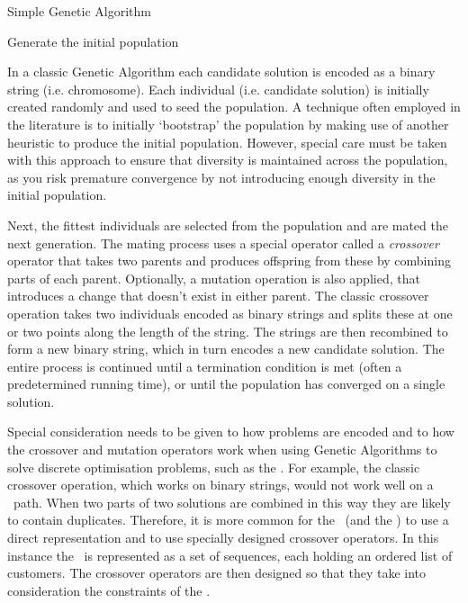 \begin{algorithm}[H]
   \caption{Simple Genetic Algorithm}
   Generate the initial population\\
\end{algorithm}

In a classic Genetic Algorithm each candidate solution is encoded as a binary string (i.e. chromosome). Each individual (i.e. candidate solution) is initially created randomly and used to seed the population. A technique often employed in the literature is to initially `bootstrap' the population by making use of another heuristic to produce the initial population. However, special care must be taken with this approach to ensure that diversity is maintained across the population, as you risk premature convergence by not introducing enough diversity in the initial population. 

Next, the fittest individuals are selected from the population and are mated the next generation. The mating process uses a special operator called a \emph{crossover} operator that takes two parents and produces offspring from these by combining parts of each parent. Optionally, a mutation operation is also applied, that introduces a change that doesn't exist in either parent. The classic crossover operation takes two individuals encoded as binary strings and splits these at one or two points along the length of the string. The strings are then recombined to form a new binary string, which in turn encodes a new candidate solution. The entire process is continued until a termination condition is met (often a predetermined running time), or until the population has converged on a single solution.

Special consideration needs to be given to how problems are encoded and to how the crossover and mutation operators work when using Genetic Algorithms to solve discrete optimisation problems, such as the \VRP. For example, the classic crossover operation, which works on binary strings, would not work well on a \TSP\ path. When two parts of two solutions are combined in this way they are likely to contain duplicates. Therefore, it is more common for the \VRP\ (and the \TSP) to use a direct representation and to use specially designed crossover operators. In this instance the \VRP\ is represented as a set of sequences, each holding an ordered list of customers. The crossover operators are then designed so that they take into consideration the constraints of the \VRP.

